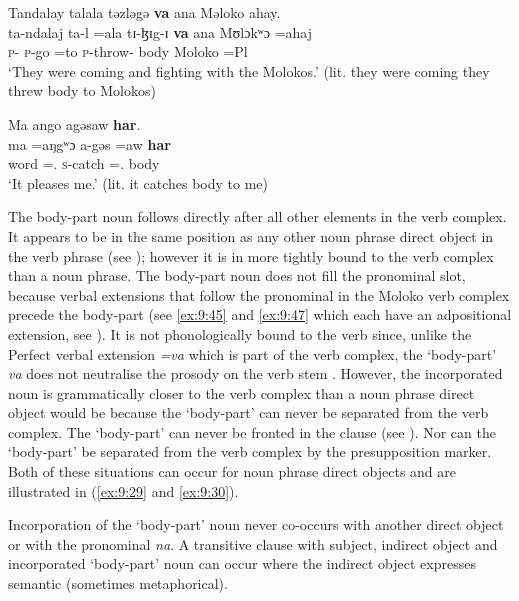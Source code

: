 \ea \label{ex:9:48}
Tandalay  talala  təzləgə  \textbf{va} ana  Məloko  ahay.\\
\gll  ta-ndalaj ta-l =ala  tɪ-ɮɪg-ɪ   \textbf{va}  ana  Mʊlɔkʷɔ    =ahaj\\
      \textsc{p}-{\PRG}   \textsc{p}-go =to  \textsc{p}-throw-{\CL} body  {\DAT} Moloko    =Pl\\
\glt  ‘They were coming and fighting with the Molokos.’ (lit. they were coming they threw body to Molokos)
\z

\ea \label{ex:9:49}
Ma  ango  agəsaw  \textbf{har}.\\
\gll  ma     =aŋgʷɔ    a-gəs     =aw  \textbf{har}\\
      word  ={\twoS}.{\POSS}  \textsc{s}-catch ={\oneS}.{\IO}  body\\
\glt  ‘It pleases me.’ (lit. it catches body to me)
\z

The body-part noun follows directly after all other elements in the verb complex. It appears to be in the same position as any other noun phrase direct object in the verb phrase (see ); however it is in more tightly bound to the verb complex than a noun phrase. The body-part noun does not fill the \DO pronominal slot, because verbal extensions that follow the \DO pronominal in the Moloko verb complex precede the body-part (see \ref{ex:9:45} and \ref{ex:9:47} which each have an adpositional extension, see ). It is not phonologically bound to the verb since, unlike the Perfect verbal extension \textit{=va} which is part of the verb complex, the ‘body-part’ \textit{va} does not neutralise the prosody on the verb stem . However, the incorporated noun is grammatically closer to the verb complex than a noun phrase direct object would be because the ‘body-part’ can never be separated from the verb complex. The ‘body-part’ can never be fronted in the clause (see ). Nor can the ‘body-part’ be separated from the verb complex by the presupposition marker. Both of these situations can occur for noun phrase direct objects and are illustrated in  (\ref{ex:9:29} and \ref{ex:9:30}). 

Incorporation of the ‘body-part’ noun never co-occurs with another direct object or with the \DO pronominal \textit{na}. A transitive clause with subject, indirect object and incorporated ‘body-part’ noun can occur where the indirect object expresses semantic \LOC (sometimes metaphorical).

